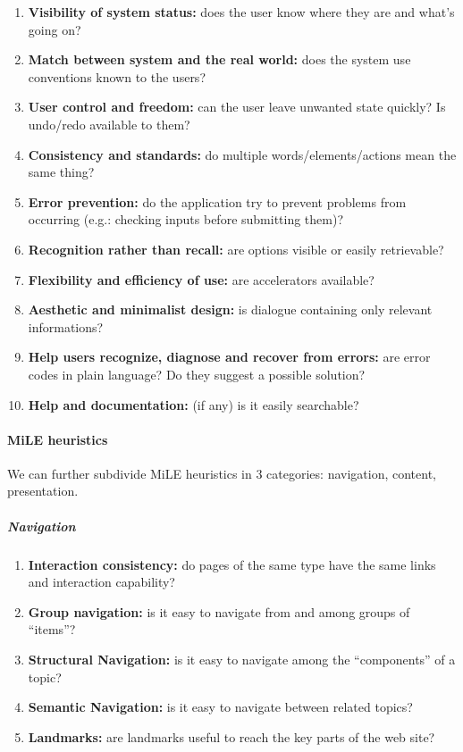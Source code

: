 \begin{enumerate}[start=1,label={\bf H\arabic{*}}]
    \item \textbf{Visibility of system status:} does the user know where they are and    
          what's going on?
    \item \textbf{Match between system and the real world:} does the system use 
          conventions known to the users?
    \item \textbf{User control and freedom:} can the user leave unwanted state quickly? 
          Is undo/redo available to them?
    \item \textbf{Consistency and standards:} do multiple words/elements/actions mean    
          the same thing?
    \item \textbf{Error prevention:} do the application try to prevent problems 
          from occurring (e.g.: checking inputs before submitting them)?
    \item \textbf{Recognition rather than recall:} are options visible or easily 
          retrievable?
    \item \textbf{Flexibility and efficiency of use:} are accelerators available?
    \item \textbf{Aesthetic and minimalist design:} is dialogue containing only relevant 
          informations?
    \item \textbf{Help users recognize, diagnose and recover from errors:} are error 
          codes in plain language? Do they suggest a possible solution?
    \item \textbf{Help and documentation:} (if any) is it easily searchable?
\end{enumerate}

\paragraph*{MiLE heuristics}

We can further subdivide MiLE heuristics in 3 categories: navigation, content, presentation.

\subparagraph*{Navigation}

\begin{enumerate}[start=1,label={\bf MN\arabic{*}}]
    \item \textbf{Interaction consistency:} do pages of the same type have the same links
          and interaction capability?
    \item \textbf{Group navigation:} is it easy to navigate from and among groups of
          ``items''?
    \item \textbf{Structural Navigation:} is it easy to navigate among the ``components'' of a topic?
    \item \textbf{Semantic Navigation:} is it easy to navigate between related topics?
    \item \textbf{Landmarks:} are landmarks useful to reach the key parts of the web
          site?
\end{enumerate}

